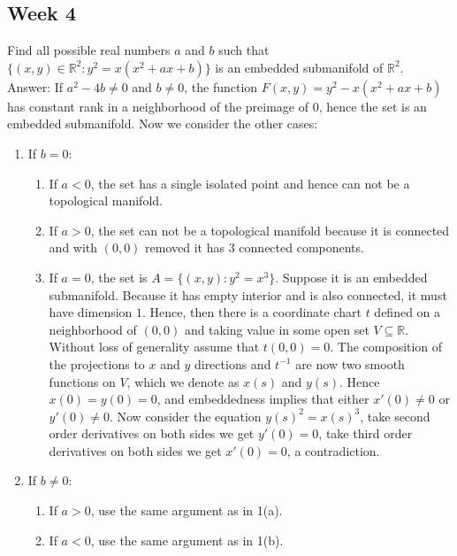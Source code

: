 \documentclass{article}
\theoremstyle{definition}
\begin{document}
\newpage

\subsection{Week 4}

Find all possible real numbers $a$ and $b$ such that $\{(x,y)\in\mathbb{R}^2:y^2=x(x^2+ax+b)\}$ is an embedded submanifold of $\mathbb{R}^2$.\\

Answer: If $a^2-4b\not=0$ and $b\not=0$, the function $F(x, y)=y^2-x(x^2+ax+b)$ has constant rank in a neighborhood of the preimage of $0$, hence the set is an embedded submanifold. Now we consider the other cases:

\begin{enumerate}
    \item If $b=0$:
       \begin{enumerate}
           \item If $a<0$, the set has a single isolated point and hence can not be a topological manifold.
           \item If $a>0$, the set can not be a topological manifold because it is connected and with $(0, 0)$ removed it has $3$ connected components.
           \item If $a=0$, the set is $A=\{(x, y): y^2=x^3\}$. Suppose it is an embedded submanifold. Because it has empty interior and is also connected, it must have dimension $1$. Hence, then there is a coordinate chart $t$ defined on a neighborhood of $(0, 0)$ and taking value in some open set $V\subseteq\mathbb{R}$. Without loss of generality assume that $t(0, 0)=0$. The composition of the projections to $x$ and $y$ directions and $t^{-1}$ are now two smooth functions on $V$, which we denote as $x(s)$ and $y(s)$. Hence $x(0)=y(0)=0$, and embeddedness implies that either $x'(0)\not=0$ or $y'(0)\not=0$. Now consider the equation $y(s)^2=x(s)^3$, take second order derivatives on both sides we get $y'(0)=0$, take third order derivatives on both sides we get $x'(0)=0$, a contradiction.
       \end{enumerate}
    \item If $b\not=0$:
       \begin{enumerate}
           \item If $a>0$, use the same argument as in 1(a).
           \item If $a<0$, use the same argument as in 1(b).
       \end{enumerate}
       
\end{enumerate}
\end{document}
